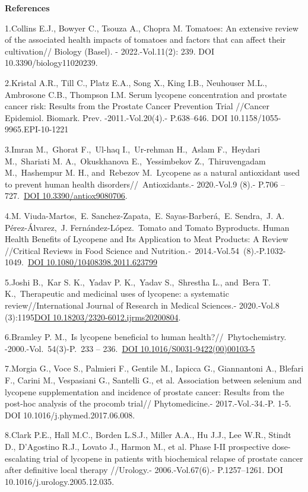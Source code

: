 {\bfseries References}

1.Collins E.J., Bowyer C., Tsouza A., Chopra M. Tomatoes: An extensive
review of the associated health impacts of tomatoes and factors that can
affect their cultivation// Biology (Basel). - 2022.-Vol.11(2): 239. DOI
10.3390/biology11020239.

2.Kristal A.R., Till C., Platz E.A., Song X., King I.B., Neuhouser M.L.,
Ambrosone C.B., Thompson I.M. Serum lycopene concentration and prostate
cancer risk: Results from the Prostate Cancer Prevention Trial //Cancer
Epidemiol. Biomark. Prev. -2011.-Vol.20(4).- P.638--646. DOI
10.1158/1055-9965.EPI-10-1221

3.Imran M.,~Ghorat F.,~Ul-haq I.,~Ur-rehman H.,~Aslam F.,~Heydari
M.,~Shariati M. A.,~Okuskhanova E.,~Yessimbekov Z.,~Thiruvengadam
M.,~Hashempur M. H., and~Rebezov M.~Lycopene as a natural antioxidant
used to prevent human health disorders//~Antioxidants.- 2020.-Vol.9
(8).- P.706 -- 727.~\href{https://doi.org/10.3390/antiox9080706}{DOI
10.3390/antiox9080706}.~

4.M. Viuda-Martos,~E. Sanchez-Zapata,~E. Sayas-Barberá,~E. Sendra,~J. A.
Pérez-Álvarez,~J. Fernández-López.~Tomato and Tomato Byproducts. Human
Health Benefits of Lycopene and Its Application to Meat Products: A
Review //Critical Reviews in Food Science and
Nutrition\emph{.-}~2014.-Vol.54\emph{~}(8).-P.1032-1049.~\href{https://doi.org/10.1080/10408398.2011.623799}{DOI
10.1080/10408398.2011.623799}

5.Joshi B.,~Kar S. K.,~Yadav P. K.,~Yadav S.,~Shrestha L., and~Bera T.
K.,~Therapeutic and medicinal uses of lycopene: a systematic
review//International Journal of Research in Medical Sciences.-
2020.-Vol.8
(3):1195\href{https://doi.org/10.18203/2320-6012.ijrms20200804}{DOI
10.18203/2320-6012.ijrms20200804}.

6.Bramley P. M.,~Is lycopene beneficial to human
health?//~Phytochemistry. -2000.-Vol.~54(3)-P.~233 --
236.~\href{https://doi.org/10.1016/S0031-9422(00)00103-5}{DOI
10.1016/S0031-9422(00)00103-5}

7.Morgia G., Voce S., Palmieri F., Gentile M., Iapicca G., Giannantoni
A., Blefari F., Carini M., Vespasiani G., Santelli G., et al.
Association between selenium and lycopene supplementation and incidence
of prostate cancer: Results from the post-hoc analysis of the procomb
trial// Phytomedicine.- 2017.-Vol.-34.-P. 1-5. DOI
10.1016/j.phymed.2017.06.008.~

8.Clark P.E., Hall M.C., Borden L.S.J., Miller A.A., Hu J.J., Lee W.R.,
Stindt D., D'Agostino R.J., Lovato J., Harmon M., et al. Phase I-II
prospective dose-escalating trial of lycopene in patients with
biochemical relapse of prostate cancer after definitive local therapy
//Urology.- 2006.-Vol.67(6).- P.1257--1261. DOI
10.1016/j.urology.2005.12.035.

